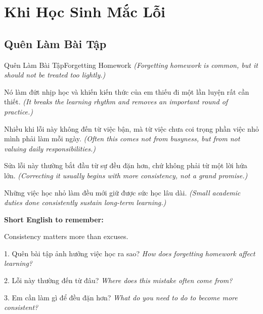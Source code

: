 \chapter{Khi Học Sinh Mắc Lỗi}

\section{Quên Làm Bài Tập}
\begin{truyen}{Quên Làm Bài Tập}{Forgetting Homework}
\textit{(Forgetting homework is common, but it should not be treated too lightly.)}

Nó làm đứt nhịp học và khiến kiến thức của em thiếu đi một lần luyện rất cần thiết.
\textit{(It breaks the learning rhythm and removes an important round of practice.)}

Nhiều khi lỗi này không đến từ việc bận, mà từ việc chưa coi trọng phần việc nhỏ mình phải làm mỗi ngày.
\textit{(Often this comes not from busyness, but from not valuing daily responsibilities.)}

Sửa lỗi này thường bắt đầu từ sự đều đặn hơn, chứ không phải từ một lời hứa lớn.
\textit{(Correcting it usually begins with more consistency, not a grand promise.)}
\end{truyen}

\begin{baihoc}
Những việc học nhỏ làm đều mới giữ được sức học lâu dài.
\textit{(Small academic duties done consistently sustain long-term learning.)}
\end{baihoc}

\begin{ghinhoanh}
\textbf{Short English to remember:}

Consistency matters more than excuses.

\end{ghinhoanh}

\begin{tuhocnhanh}
1. Quên bài tập ảnh hưởng việc học ra sao? \textit{How does forgetting homework affect learning?}

2. Lỗi này thường đến từ đâu? \textit{Where does this mistake often come from?}

3. Em cần làm gì để đều đặn hơn? \textit{What do you need to do to become more consistent?}
\end{tuhocnhanh}
\ngancach

